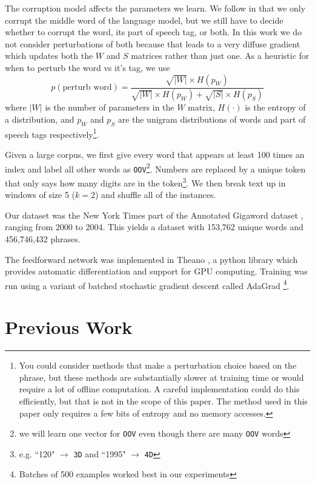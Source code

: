 \documentclass[11pt,letterpaper]{article}
\begin{document}
The corruption model affects the parameters we learn.
We follow \cite{rami} in that we only corrupt the middle word of the language model,
but we still have to decide whether to corrupt the word, its part of speech tag, or both.
In this work we do not consider perturbations of both because that leads to a very
diffuse gradient which updates both the $W$ and $S$ matrices rather than just one.
As a heuristic for when to perturb the word vs it's tag, we use
\[
	p(\mbox{perturb word}) = \frac
		{\sqrt{|W|} \times H(p_W)}
	{\sqrt{|W|} \times H(p_W) + \sqrt{|S|} \times H(p_S)}
\]
where $|W|$ is the number of parameters in the $W$ matrix, $H(\cdot)$ is
the entropy of a distribution, and $p_W$ and $p_S$ are the unigram distributions
of words and part of speech tags respectively\footnote{You could consider methods
that make a perturbation choice based on the phrase, but these methods are
substantially slower at training time or would require a lot of offline computation.
A careful implementation could do this efficiently, but that is not in the scope of this paper.
The method used in this paper only requires a few bits of entropy and no memory accesses.}.



Given a large corpus, we first give every word that appears at least 100
times an index and label all other words as \texttt{OOV}\footnote{we will learn
one vector for \texttt{OOV} even though there are many \texttt{OOV} words}.
Numbers are replaced by a unique token that only says how many digits are in
the token\footnote{e.g. ``120" $\rightarrow$ \texttt{3D} and ``1995" $\rightarrow$ \texttt{4D}}.
We then break text up in windows of size 5 ($k=2$) and shuffle all of the instances.

Our dataset was the New York Times part of the Annotated Gigaword dataset \cite{agiga},
ranging from 2000 to 2004. This yields a dataset with 153,762 unique words and 
456,746,432 phrases.

The feedforward network was implemented in Theano \cite{theano},
a python library which provides automatic differentiation and support for GPU computing.
Training was run using a variant of batched stochastic gradient descent called AdaGrad \cite{adagrad}
\footnote{Batches of 500 examples worked best in our experiments}.






\section{Previous Work} %
\end{document}
